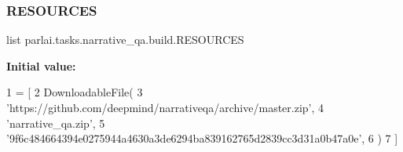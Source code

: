 \subsubsection{\texorpdfstring{R\+E\+S\+O\+U\+R\+C\+ES}{RESOURCES}}
{\footnotesize\ttfamily list parlai.\+tasks.\+narrative\+\_\+qa.\+build.\+R\+E\+S\+O\+U\+R\+C\+ES}

{\bfseries Initial value\+:}
\begin{DoxyCode}
1 =  [
2     DownloadableFile(
3         \textcolor{stringliteral}{'https://github.com/deepmind/narrativeqa/archive/master.zip'},
4         \textcolor{stringliteral}{'narrative\_qa.zip'},
5         \textcolor{stringliteral}{'9f6c484664394e0275944a4630a3de6294ba839162765d2839cc3d31a0b47a0e'},
6     )
7 ]
\end{DoxyCode}
